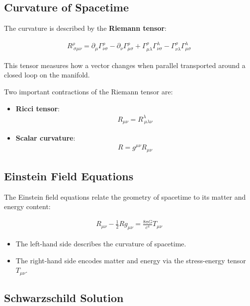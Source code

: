 \documentclass{aleph-revista}
\begin{document}
\subsection{Curvature of Spacetime}

The curvature is described by the \textbf{Riemann tensor}:

\begin{align*}
R^\rho_{\ \sigma\mu\nu} = \partial_\mu \Gamma^\rho_{\nu\sigma} - \partial_\nu \Gamma^\rho_{\mu\sigma} + \Gamma^\rho_{\mu\lambda} \Gamma^\lambda_{\nu\sigma} - \Gamma^\rho_{\nu\lambda} \Gamma^\lambda_{\mu\sigma}
\end{align*}

This tensor measures how a vector changes when parallel transported around a closed loop on the manifold.

Two important contractions of the Riemann tensor are:

\begin{itemize}
  \item \textbf{Ricci tensor}:
  \begin{align*}
  R_{\mu\nu} = R^\lambda_{\ \mu\lambda\nu}
  \end{align*}
  \item \textbf{Scalar curvature}:
  \begin{align*}
  R = g^{\mu\nu} R_{\mu\nu}
  \end{align*}
\end{itemize}

\subsection{Einstein Field Equations}

The Einstein field equations relate the geometry of spacetime to its matter and energy content:

\begin{align*}
R_{\mu\nu} - \frac{1}{2} R g_{\mu\nu} = \frac{8\pi G}{c^4} T_{\mu\nu}
\end{align*}

\begin{itemize}
  \item The left-hand side describes the curvature of spacetime.
  \item The right-hand side encodes matter and energy via the stress-energy tensor \(T_{\mu\nu}\).
\end{itemize}

\subsection{Schwarzschild Solution}
\end{document}
